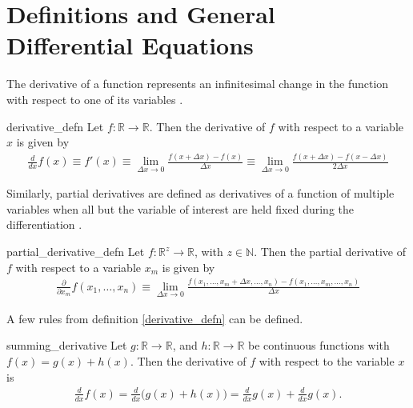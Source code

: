 
\section{Definitions and General Differential Equations}
 The derivative of a function represents an infinitesimal change in the function with respect to one of its variables \cite{bib:Wolfram}. 
\begin{defn}[Derivative]{derivative_defn} 
	Let $f:\mathbb{R}\rightarrow\mathbb{R}$. Then the derivative of $f$ with respect to a variable $x$ is given by
	\begin{align*}
	\frac{d}{dx}f(x)\equiv f'(x) \equiv\lim\limits_{\Delta x \rightarrow 0}\frac{f(x+\Delta x)-f(x)}{\Delta x} \equiv \lim\limits_{\Delta x \rightarrow 0}\frac{f(x+\Delta x)-f(x-\Delta x)}{2\Delta x}
	\end{align*}
\end{defn}
Similarly, partial derivatives are defined as derivatives of a function of multiple variables when all but the variable of interest are held fixed during the differentiation \cite{bib:Wolfram}. 
\begin{defn}{partial_derivative_defn}
	Let $f:\mathbb{R}^z\rightarrow\mathbb{R}$, with $z \in \mathbb{N}$. Then the partial derivative of $f$ with respect to a variable $x_m$ is given by
	\begin{align*}
	\frac{\partial}{\partial x_m}f(x_1,\dots,x_n) \equiv \lim\limits_{\Delta x \rightarrow 0}\frac{f(x_1,\dots,x_m+\Delta x, \dots,x_n)-f(x_1,\dots,x_m,\dots,x_n)}{\Delta x}
	\end{align*}
\end{defn}
A few rules from definition \ref{derivative_defn} can be defined.
\begin{theo}{summing_derivative}
	Let $g:\mathbb{R}\rightarrow\mathbb{R}$, and $h:\mathbb{R}\rightarrow\mathbb{R}$ be continuous functions with $f(x)=g(x)+h(x)$. Then the derivative of $f$ with respect to the variable $x$ is 
	\begin{align*}
	\frac{d}{dx}f(x)=\frac{d}{dx}\big(g(x)+h(x)\big) = \frac{d}{dx}g(x)+\frac{d}{dx}g(x).
	\end{align*} 
\end{theo}

